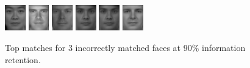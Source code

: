 \begin{figure}[hbt]
  \includegraphics[width=0.08\textwidth]{../results/H_rez/incorrect90/3/5.jpg}
  \includegraphics[width=0.08\textwidth]{../results/H_rez/incorrect90/3/6.jpg}
  \includegraphics[width=0.08\textwidth]{../results/H_rez/incorrect90/3/7.jpg}
  \includegraphics[width=0.08\textwidth]{../results/H_rez/incorrect90/3/8.jpg}
  \includegraphics[width=0.08\textwidth]{../results/H_rez/incorrect90/3/8.jpg}
  \includegraphics[width=0.08\textwidth]{../results/H_rez/incorrect90/3/10.jpg}
  \caption{Top matches for 3 incorrectly matched faces at 90\% information retention.}
  \label{fig:incorrect90}
\end{figure}

~\vfill

\clearpage

~\vfill

